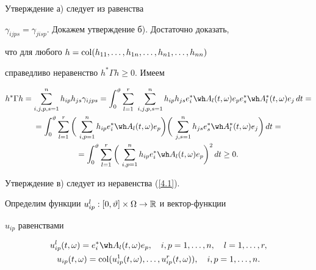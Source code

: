 \begin{pf} Утверждение а) следует из равенства


$\gamma_{ijps}=\gamma_{jisp}$. Докажем утверждение б). Достаточно доказать,


что для любого $h=\operatorname{col}(h_{11},\dotsc,h_{1n},\dotsc,h_{n1},\dotsc,h_{nn})$


справедливо неравенство $h^*\Gamma h\ge 0$. Имеем


\begin{multline}


\label{4.1}


h^*\Gamma h=\sum_{i,j,p,s=1}^n h_{ip}h_{js}\gamma_{ijps}=\int_0^{\vt}


\sum_{l=1}^r\;\sum_{i,j,p,s=1}^n h_{ip}h_{js}e_i^*\wh A_l(t,\omega)e_pe_s^*


\wh A_l^*(t,\omega)e_j\,dt=\\


=\int_0^{\vt}\sum_{l=1}^r


\bigg(\,\sum_{i,p=1}^n h_{ip}e_i^*\wh A_l(t,\omega)e_p\bigg)


\bigg(\,\sum_{j,s=1}^nh_{js}e_s^*\wh A_l^*(t,\omega)e_j\bigg)\,dt=\\


=\int_0^{\vt}\sum_{l=1}^r\bigg(\,\sum_{i, p=1}^n


h_{ip}e_i^*\wh A_l(t,\omega)e_p\bigg)^2\,dt\ge 0.


\end{multline}


Утверждение в) следует из неравенства (\ref{4.1}).


\end{pf}





Определим функции $u_{ip}^l:[0,\vartheta]\times\Omega\to\Bbb R$ и вектор-функции


$u_{ip}$ равенствами


\begin{gather}


\label{4.2}


u_{ip}^l(t,\omega)=e_i^*\wh A_l(t,\omega)e_p,


\quad i,p=1,\dotsc,n,\quad l=1,\dotsc,r,\\


\label{4.3}


u_{ip}(t,\omega)=\col(u_{ip}^1(t,\omega),\dotsc,u_{ip}^r(t,\omega)),


\quad i,p=1,\dotsc,n.


\end{gather}





